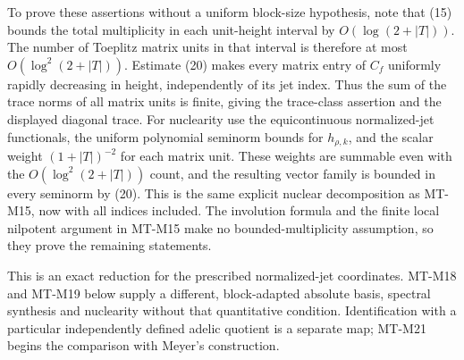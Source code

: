 To prove these assertions without a uniform block-size
hypothesis, note that (15) bounds the total multiplicity
in each unit-height interval by $O(\log(2+|T|))$.
The number of Toeplitz matrix units in that interval is
therefore at most $O(\log^2(2+|T|))$.
Estimate (20) makes every matrix entry of $C_f$ uniformly
rapidly decreasing in height, independently of its jet
index. Thus the sum of the trace norms of all matrix
units is finite, giving the trace-class assertion and
the displayed diagonal trace. For nuclearity use the
equicontinuous normalized-jet functionals, the uniform
polynomial seminorm bounds for $h_{\rho,k}$, and the
scalar weight $(1+|T|)^{-2}$ for each matrix unit.
These weights are summable even with the
$O(\log^2(2+|T|))$ count, and the resulting vector
family is bounded in every seminorm by (20).
This is the same explicit nuclear decomposition as
MT-M15, now with all indices included.
The involution formula and the finite local nilpotent
argument in MT-M15 make no bounded-multiplicity
assumption, so they prove the remaining statements.

This is an exact reduction for the prescribed normalized-jet
coordinates. MT-M18 and MT-M19 below supply a different,
block-adapted absolute basis, spectral synthesis and nuclearity
without that quantitative condition. Identification with a
particular independently defined adelic quotient is a separate
map; MT-M21 begins the comparison with Meyer's construction.
